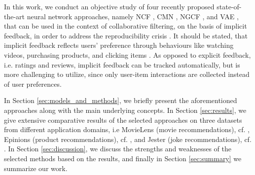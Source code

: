 In this work, we conduct an objective study of four recently proposed state-of-the-art neural network approaches, namely NCF \cite{he2017neural}, CMN \cite{ebesu2018collaborative}, NGCF \cite{wang2019neural}, and VAE \cite{liang2018variational}, that can be used in the context of collaborative filtering, on the basis of implicit feedback, in order to address the reproducibility crisis \cite{dacrema2019we}.
It should be stated, that implicit feedback reflects users' preference through behaviours like watching videos, purchasing products, and clicking items \cite{hu2008collaborative}.
As opposed to explicit feedback, i.e. ratings and reviews, implicit feedback can be tracked automatically, but is more challenging to utilize, since only user-item interactions are collected instead of user preferences.

In Section \ref{sec:models_and_methods}, we briefly present the aforementioned approaches along with the main underlying concepts.
In Section \ref{sec:results}, we give extensive comparative results of the selected approaches on three datasets from different application domains, i.e MovieLens (movie recommendations), cf. \cite{harper2016movielens}, Epinions (product recommendations), cf. \cite{epinions}, and Jester (joke recommendations), cf. \cite{jester}.
In Section \ref{sec:discussion}, we discuss the strengths and weaknesses of the selected methods based on the results, and finally in Section \ref{sec:summary} we summarize our work.

